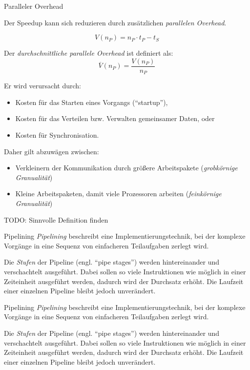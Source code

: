 \begin{defi}{Paralleler Overhead}
    
    Der Speedup kann sich reduzieren durch zusätzlichen \emph{parallelen Overhead}.
    
    \[
        V(n_P) = n_P \cdot t_P - t_S
    \]
    
    Der \emph{durchschnittliche parallele Overhead} ist definiert als:
    \[
        \overline{V}(n_P) = \frac{V(n_P)}{n_P}
    \]
    
    Er wird verursacht durch:
    \begin{itemize}
        \item Kosten für das Starten eines Vorgangs (\enquote{startup}),
        \item Kosten für das Verteilen bzw. Verwalten gemeinsamer Daten, oder
        \item Kosten für Synchronisation.
    \end{itemize}
    
    Daher gilt abzuwägen zwischen:
    \begin{itemize}
        \item Verkleinern der Kommunikation durch größere Arbeitspakete (\emph{grobkörnige Granualität})
        \item Kleine Arbeitspaketen, damit viele Prozessoren arbeiten (\emph{feinkörnige Granualität})
    \end{itemize}
    
    TODO: Sinnvolle Definition finden
\end{defi}

\begin{defi}{Pipelining}
    \emph{Pipelining} beschreibt eine Implementierungstechnik, bei der komplexe Vorgänge in eine Sequenz von einfacheren Teilaufgaben zerlegt wird.
    
    Die \emph{Stufen} der Pipeline (engl. \enquote{pipe stages}) werden hintereinander und verschachtelt ausgeführt.
    Dabei sollen so viele Instruktionen wie möglich in einer Zeiteinheit ausgeführt werden, dadurch wird der Durchsatz erhöht.
    Die Laufzeit einer einzelnen Pipeline bleibt jedoch unverändert.
\end{defi}

\begin{example}{Pipelining}
    \emph{Pipelining} beschreibt eine Implementierungstechnik, bei der komplexe Vorgänge in eine Sequenz von einfacheren Teilaufgaben zerlegt wird.
    
    Die \emph{Stufen} der Pipeline (engl. \enquote{pipe stages}) werden hintereinander und verschachtelt ausgeführt.
    Dabei sollen so viele Instruktionen wie möglich in einer Zeiteinheit ausgeführt werden, dadurch wird der Durchsatz erhöht.
    Die Laufzeit einer einzelnen Pipeline bleibt jedoch unverändert.
\end{example}


